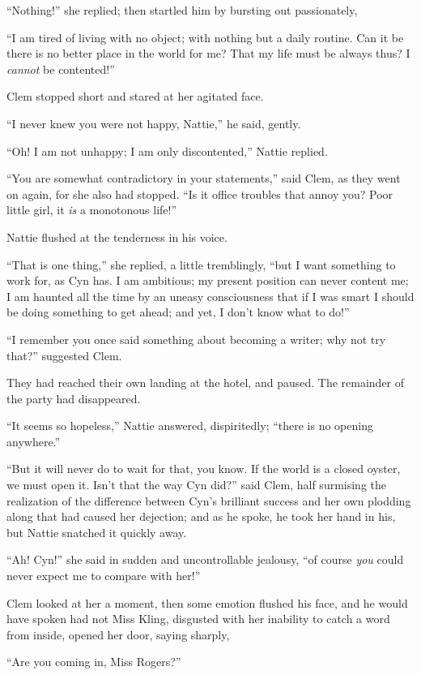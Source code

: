 ``Nothing!'' she replied; then startled him by bursting out passionately,

``I am tired of living with no object; with nothing but a daily routine.
Can it be there is no better place in the world for me? That my life
must be always thus? I \emph{cannot} be contented!''

Clem stopped short and stared at her agitated face.

``I never knew you were not happy, Nattie,'' he said, gently.

``Oh! I am not unhappy; I am only discontented,'' Nattie replied.

``You are somewhat contradictory in your statements,'' said Clem, as they
went on again, for she also had stopped. ``Is it office troubles that
annoy you? Poor little girl, it \emph{is} a monotonous life!''

Nattie flushed at the tenderness in his voice.

``That is one thing,'' she replied, a little tremblingly, ``but I want
something to work for, as Cyn has. I am ambitious; my present position
can never content me; I am haunted all the time by an uneasy
consciousness that if I was smart I should be doing something to get
ahead; and yet, I don't know what to do!''

``I remember you once said something about becoming a writer; why not try
that?'' suggested Clem.

They had reached their own landing at the hotel, and paused. The
remainder of the party had disappeared.

``It seems so hopeless,'' Nattie answered, dispiritedly; ``there is no
opening anywhere.''

``But it will never do to wait for that, you know. If the world is a
closed oyster, we must open it. Isn't that the way Cyn did?'' said Clem,
half surmising the realization of the difference between Cyn's brilliant
success and her own plodding along that had caused her dejection; and as
he spoke, he took her hand in his, but Nattie snatched it quickly away.

``Ah! Cyn!'' she said in sudden and uncontrollable jealousy, ``of course
\emph{you} could never expect me to compare with her!''

Clem looked at her a moment, then some emotion flushed his face, and he
would have spoken had not Miss Kling, disgusted with her inability to
catch a word from inside, opened her door, saying sharply,

``Are you coming in, Miss Rogers?''

